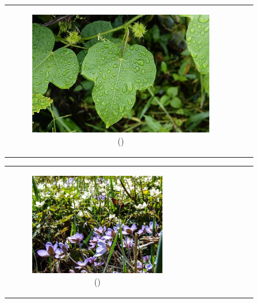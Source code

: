 \documentclass{BachelorBUI}
\begin{document}
\begin{figure}[!h]
\begin{tabular}{ccc}
\begin{subfigure}{0.30\textwidth}
                    \includegraphics[width=\textwidth]{6_artificial_background.jpg}
                    \caption{\centering (\cite{6_artificial_background:2017})}
                \end{subfigure} \\
            \end{tabular}
            \begin{tabular}{ccc}
                \begin{subfigure}{0.30\textwidth}
                    \centering
                    \includegraphics[width=\textwidth]{7_artificial_background.jpg}
                    \caption{\centering (\cite{7_artificial_background:2019})}
                \end{subfigure} &
                \begin{subfigure}{0.30\textwidth}

\end{subfigure}
\end{tabular}
\end{figure}
\end{document}
